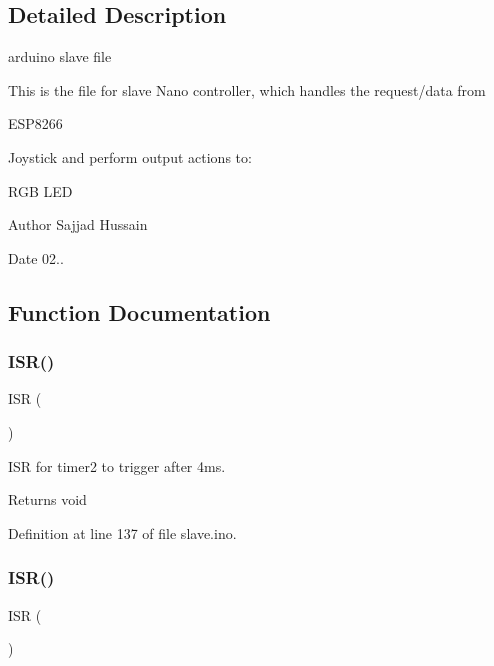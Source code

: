 \subsection{Detailed Description}
arduino slave file 

This is the file for slave Nano controller, which handles the request/data from
\begin{DoxyItemize}
\item E\+S\+P8266
\item Joystick and perform output actions to\+:
\item R\+GB L\+ED
\end{DoxyItemize}

\begin{DoxyAuthor}{Author}
Sajjad Hussain
\end{DoxyAuthor}
\begin{DoxyDate}{Date}
02.. 
\end{DoxyDate}


\subsection{Function Documentation}
\mbox{\label{slave_8ino_a5686c229bdef50123688ab6cb1404230}} 
\subsubsection{\texorpdfstring{ISR()}{ISR()}\hspace{0.1cm}{\footnotesize\ttfamily [1/2]}}
{\footnotesize\ttfamily I\+SR (\begin{DoxyParamCaption}\item[{T\+I\+M\+E\+R2\+\_\+\+C\+O\+M\+P\+A\+\_\+vect}]{ }\end{DoxyParamCaption})}



I\+SR for timer2 to trigger after 4ms. 

\begin{DoxyReturn}{Returns}
void 
\end{DoxyReturn}


Definition at line 137 of file slave.\+ino.

\mbox{\label{slave_8ino_aa282d056dc0e67857fc700fdce321f30}} 
\subsubsection{\texorpdfstring{ISR()}{ISR()}\hspace{0.1cm}{\footnotesize\ttfamily [2/2]}}
{\footnotesize\ttfamily I\+SR (\begin{DoxyParamCaption}\item[{T\+I\+M\+E\+R2\+\_\+\+C\+O\+M\+P\+B\+\_\+vect}]{ }\end{DoxyParamCaption})}



